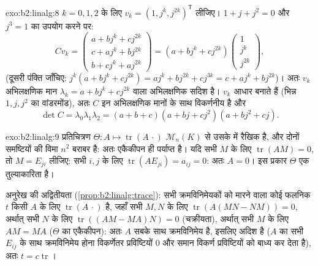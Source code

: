 \begin{solution}{exo:b2:linalg:8}
$k = 0, 1, 2$ के लिए $v_k = (1, j^k, j^{2k})^{\mathsf T}$ लीजिए। $1
+ j + j^2 = 0$ और $j^3 = 1$ का उपयोग करने पर:
\[
C v_k =
\begin{pmatrix}
a + b j^k + c j^{2k}\\
c + a j^k + b j^{2k}\\
b + c j^k + a j^{2k}
\end{pmatrix}
= (a + b j^k + c j^{2k})
\begin{pmatrix} 1\\ j^k\\ j^{2k}\end{pmatrix},
\]
(दूसरी पंक्ति जाँचिए: $j^k(a + bj^k + cj^{2k}) = aj^k + bj^{2k} +
cj^{3k} = c + aj^k + bj^{2k}$)। अतः $v_k$ अभिलक्षणिक मान $\lambda_k = a + bj^k + cj^{2k}$ वाला
अभिलक्षणिक सदिश है। $v_k$ आधार बनाते हैं (भिन्न $1, j, j^2$ का वांडरमोंड), अतः
$C$ इन अभिलक्षणिक मानों के साथ विकर्णनीय है और
\[
\det C = \lambda_0\lambda_1\lambda_2
= (a+b+c)(a + bj + cj^2)(a + bj^2 + cj).
\]
\end{solution}

\begin{solution}{exo:b2:linalg:9}
प्रतिचित्रण $\Theta \colon A \mapsto \operatorname{tr}(A\,\cdot)$ $\mathcal{M}_n(K)$ से उसके  में रैखिक है, और दोनों समष्टियों की
विमा $n^2$ बराबर है: अतः एकैकीपन ही पर्याप्त है। यदि सभी $M$ के लिए
$\operatorname{tr}(AM) =
0$, तो $M = E_{ji}$ लीजिए: सभी $i, j$ के लिए $\operatorname{tr}(A E_{ji}) =
a_{ij} = 0$: अतः $A = 0$। इस प्रकार $\Theta$ एक
तुल्याकारिता है।

अनुरेख की अद्वितीयता (\cref{prop:b2:linalg:trace}): सभी क्रमविनिमेयकों को मारने वाला कोई
फलनिक $t$ किसी $A$ के लिए $\operatorname{tr}(A\,\cdot)$ है, जहाँ सभी $M, N$ के लिए $\operatorname{tr}(A(MN - NM)) = 0$, अर्थात्
सभी $N$ के लिए $\operatorname{tr}((AM - MA)N) = 0$ (चक्रीयता), अर्थात् सभी $M$ के लिए $AM = MA$ ($\Theta$ का
एकैकीपन): अतः $A$ सबके साथ क्रमविनिमेय है, इसलिए अदिश है ($A$ का
सभी $E_{ij}$ के साथ क्रमविनिमेय होना विकर्णेतर प्रविष्टियों $0$ और समान
विकर्ण प्रविष्टियों को बाध्य कर देता है), अतः $t = c
\operatorname{tr}$।
\end{solution}

